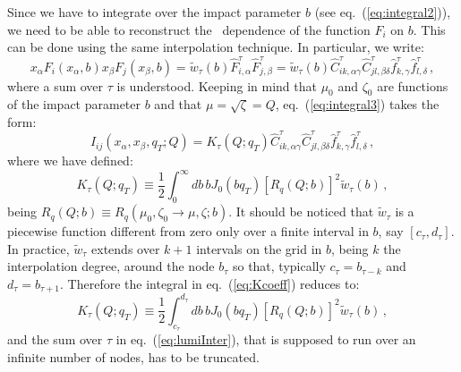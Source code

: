 \documentclass[10pt,a4paper]{article}
\begin{document}
Since we have to integrate over the impact parameter $b$ (see
eq.~(\ref{eq:integral2})), we need to be able to reconstruct the \
dependence of the function $F_i$ on $b$. This can be done using the
same interpolation technique. In particular, we write:
\begin{equation}
  x_\alpha F_i(x_{\alpha},b)
  x_\beta F_j(x_\beta,b) = 
  \widetilde{w}_{\tau}(b) \hat{F}_{i,\alpha}^\tau \hat{F}_{j,\beta}^\tau
  = \widetilde{w}_{\tau}(b) \hat{C}_{ik,\alpha\gamma}^\tau
  \hat{C}_{jl,\beta\delta}^\tau \hat{f}_{k,\gamma}^\tau \hat{f}_{l,\delta}^\tau\,,
\end{equation}
where a sum over $\tau$ is understood. Keeping in mind that $\mu_0$
and $\zeta_0$ are functions of the impact parameter $b$ and that
$\mu=\sqrt{\zeta} =Q$, eq.~(\ref{eq:integral3}) takes the form:
\begin{equation}\label{eq:lumiInter}
  I_{ij}(x_\alpha,x_\beta,q_T;Q)= K_\tau(Q;q_T)\hat{C}_{ik,\alpha\gamma}^\tau
  \hat{C}_{jl,\beta\delta}^\tau \hat{f}_{k,\gamma}^\tau \hat{f}_{l,\delta}^\tau\,,
\end{equation}
where we have defined:
\begin{equation}\label{eq:Kcoeff}
  K_\tau(Q;q_T)\equiv\frac12\int_0^\infty db\,b J_0(bq_T)
  \left[R_q(Q;b)\right]^2 \widetilde{w}_{\tau}(b)\,,
\end{equation}
being $R_q(Q;b)\equiv R_q(\mu_0,\zeta_0\rightarrow \mu,\zeta;b)$. It
should be noticed that $\widetilde{w}_{\tau}$ is a piecewise function
different from zero only over a finite interval in $b$, say
$[c_\tau,d_\tau]$. In practice, $\widetilde{w}_{\tau}$ extends over
$k+1$ intervals on the grid in $b$, being $k$ the interpolation
degree, around the node $b_\tau$ so that, typically
$c_\tau=b_{\tau-k}$ and $d_\tau=b_{\tau+1}$. Therefore the integral in
eq.~(\ref{eq:Kcoeff}) reduces to:
\begin{equation}\label{eq:Kcoeff1}
  K_\tau(Q;q_T)\equiv\frac12\int_{c_\tau}^{d_\tau} db\,b J_0(bq_T)
  \left[R_q(Q;b)\right]^2 \widetilde{w}_{\tau}(b)\,,
\end{equation}
and the sum over $\tau$ in eq.~(\ref{eq:lumiInter}), that is supposed
to run over an infinite number of nodes, has to be truncated.
\end{document}
